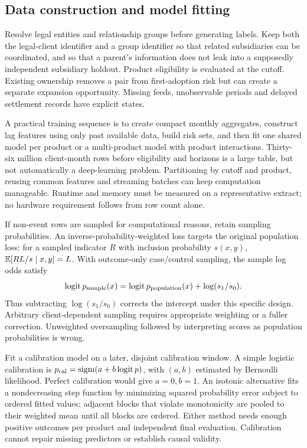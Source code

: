 \subsection{Data construction and model fitting}

Resolve legal entities and relationship groups before generating labels. Keep both the legal-client identifier and a group identifier so that related subsidiaries can be coordinated, and so that a parent's information does not leak into a supposedly independent subsidiary holdout. Product eligibility is evaluated at the cutoff. Existing ownership removes a pair from first-adoption risk but can create a separate expansion opportunity. Missing feeds, unobservable periods and delayed settlement records have explicit states.

A practical training sequence is to create compact monthly aggregates, construct lag features using only past available data, build risk sets, and then fit one shared model per product or a multi-product model with product interactions. Thirty-six million client-month rows before eligibility and horizons is a large table, but not automatically a deep-learning problem. Partitioning by cutoff and product, reusing common features and streaming batches can keep computation manageable. Runtime and memory must be measured on a representative extract; no hardware requirement follows from row count alone.

If non-event rows are sampled for computational reasons, retain sampling probabilities. An inverse-probability-weighted loss targets the original population loss: for a sampled indicator $R$ with inclusion probability $s(x,y)$, $\mathbb{E}[R L/s\mid x,y]=L$. With outcome-only case/control sampling, the sample log odds satisfy
\[
 \operatorname{logit} p_{\rm sample}(x)=\operatorname{logit} p_{\rm population}(x)+\log(s_1/s_0).
\]
Thus subtracting $\log(s_1/s_0)$ corrects the intercept under this specific design. Arbitrary client-dependent sampling requires appropriate weighting or a fuller correction. Unweighted oversampling followed by interpreting scores as population probabilities is wrong.

Fit a calibration model on a later, disjoint calibration window. A simple logistic calibration is $p_{\rm cal}=\operatorname{sigm}(a+b\operatorname{logit} p)$, with $(a,b)$ estimated by Bernoulli likelihood. Perfect calibration would give $a=0,b=1$. An isotonic alternative fits a nondecreasing step function by minimizing squared probability error subject to ordered fitted values; adjacent blocks that violate monotonicity are pooled to their weighted mean until all blocks are ordered. Either method needs enough positive outcomes per product and independent final evaluation. Calibration cannot repair missing predictors or establish causal validity.

